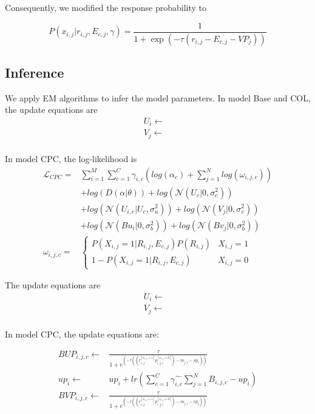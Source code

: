 \documentclass{sig-alternate}
\begin{document}
Consequently, we modified the response probability to

\begin{equation}\label{equ:responseCPV}
P(x_{i,j}|r_{i,j},E_{c,j},\gamma)=\frac{1}{1+\exp{(-\tau(r_{i,j}-E_{c,j}-VP_j))}}
\end{equation}



\subsection{Inference}

We apply EM algorithms to infer the model parameters. In model Base and COL, the update equations are
\begin{eqnarray}
U_i \leftarrow & \\\nonumber
V_j \leftarrow & \\\nonumber
\end{eqnarray}

In model CPC, the log-likelihood is  
\begin{equation*}
\begin{split}
\mathcal{L}_{CPC}=&\sum\limits_{i=1}^{M}\sum\limits_{c=1}^{C}\gamma_{i,c}(log(\alpha_c)+\sum\limits_{j=1}^{N}log(\omega_{i,j,c}))\\\nonumber
&+log(D(\alpha|\theta))+log(\mathcal{N}(U_c|0, \sigma^2_c))\\\nonumber
&+log(\mathcal{N}(U_{i,c}|U_c, \sigma^2_u))+log(\mathcal{N}(V_j|0,\sigma^2_v))\\\nonumber
&+log(\mathcal{N}(Bu_i|0,\sigma^2_b))+log(\mathcal{N}(Bv_j|0,\sigma^2_b))\\\nonumber
\omega_{i,j,c}=&
\begin{cases}
P(X_{i,j}=1|R_{i,j},E_{c,j})P(R_{i,j})& \text{$X_{i,j}=1$}\\\nonumber
1-P(X_{i,j}=1|R_{i,j},E_{c,j})& \text{$X_{i,j}=0$}
\end{cases}
\end{split}
\end{equation*}

The update equations are
\begin{eqnarray}
U_i \leftarrow & \\\nonumber
V_j \leftarrow &\\\nonumber
\end{eqnarray}


In model CPC, the update equations are:

\begin{eqnarray}
BUP_{i,j,c}\leftarrow & \frac{\tau}{1+e^{(-\tau((r_{i,j}^{[x_{i,j}=1]}p_{i,j,c}^{[x_{i,j}=0]})-m_{j,c}-up_i))}}\\\nonumber
up_i\leftarrow &up_i+lr(\sum\limits_{c=1}^{C}\hat{\gamma_{i,c}}\sum\limits_{j=1}^{N}B_{i,j,c}-up_i)\\\nonumber
BVP_{i,j,c}\leftarrow &\frac{\tau}{1+e^{(-\tau((r_{i,j}^{[x_{i,j}=1]}p_{i,j,c}^{[x_{i,j}=0]})-m_{j,c}-vp_j))}}\\\nonumber
\end{eqnarray}
\end{document}
